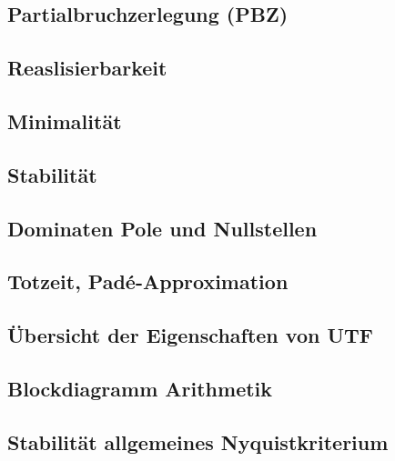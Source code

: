 \subsection{Partialbruchzerlegung (PBZ)}

\subsection{Reaslisierbarkeit}

\subsection{Minimalität}

\subsection{Stabilität}

\subsection{Dominaten Pole und Nullstellen}

\subsection{Totzeit, Padé-Approximation}

\subsection{Übersicht der Eigenschaften von UTF}

\subsection{Blockdiagramm Arithmetik}

\subsection{Stabilität allgemeines Nyquistkriterium}




